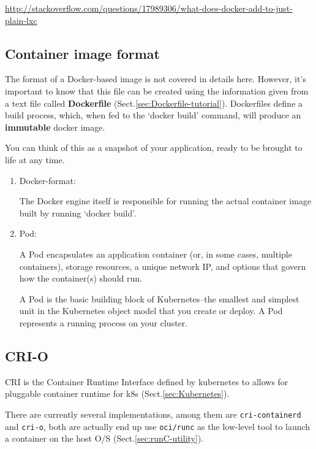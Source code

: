 \url{http://stackoverflow.com/questions/17989306/what-does-docker-add-to-just-plain-lxc}

\subsection{Container image format}

The format of a Docker-based image is not covered in details here. However, it's
important to know that this file can be created using the information  given
from a text file called {\bf Dockerfile} (Sect.\ref{sec:Dockerfile-tutorial}).
Dockerfiles define a build process, which, when fed to the ‘docker build’
command, will produce an {\bf immutable} docker image.

You can think of this as a snapshot of your application, ready to be brought to
life at any time.


\begin{enumerate}
  \item Docker-format:
  
  
  The Docker engine itself is responsible for running the actual container image built by running ‘docker build’. 
  
  
  \item Pod: 
  
  A Pod encapsulates an application container (or, in some cases, multiple
  containers), storage resources, a unique network IP, and options that govern
  how the container(s) should run.
  
  A Pod is the basic building block of Kubernetes–the smallest and simplest unit
  in the Kubernetes object model that you create or deploy. A Pod represents a
  running process on your cluster.
  
  
\end{enumerate}

\subsection{CRI-O}
\label{sec:CRI-O}


CRI is the Container Runtime Interface defined by kubernetes to allows for
pluggable container runtime for k8s (Sect.\ref{sec:Kubernetes}).

There are currently several implementations, among them are
\verb!cri-containerd! and \verb!cri-o!, both are actually end up use
\verb!oci/runc! as the low-level tool to launch a container on the host O/S
(Sect.\ref{sec:runC-utility}).

